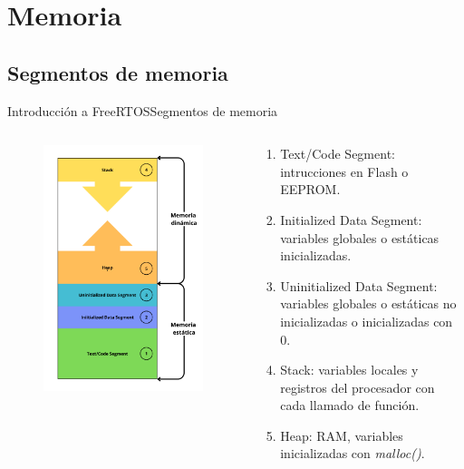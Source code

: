 \documentclass[aspectratio=169, xcolor=dvipsnames]{beamer}
\begin{document}
\section{Memoria}
\subsection{Segmentos de memoria}
\begin{frame}{Introducción a FreeRTOS}{Segmentos de memoria}
\begin{columns}
\begin{column}{0.4\textwidth}
\begin{figure}
\centering
\includegraphics[width=0.7\linewidth]{resources/images/memory_layout.png}
\end{figure}
\end{column}    
\begin{column}{0.6\textwidth}
\begin{enumerate}
    \item Text/Code Segment: intrucciones en Flash o EEPROM.
    \item Initialized Data Segment: variables globales o estáticas inicializadas.
    \item Uninitialized Data Segment: variables globales o estáticas no inicializadas o inicializadas con 0.
    \item Stack: variables locales y registros del procesador con cada llamado de función.
    \item Heap: RAM, variables inicializadas con \textit{malloc()}.
\end{enumerate}
\end{column}
\end{columns}
\end{frame}
\end{document}
